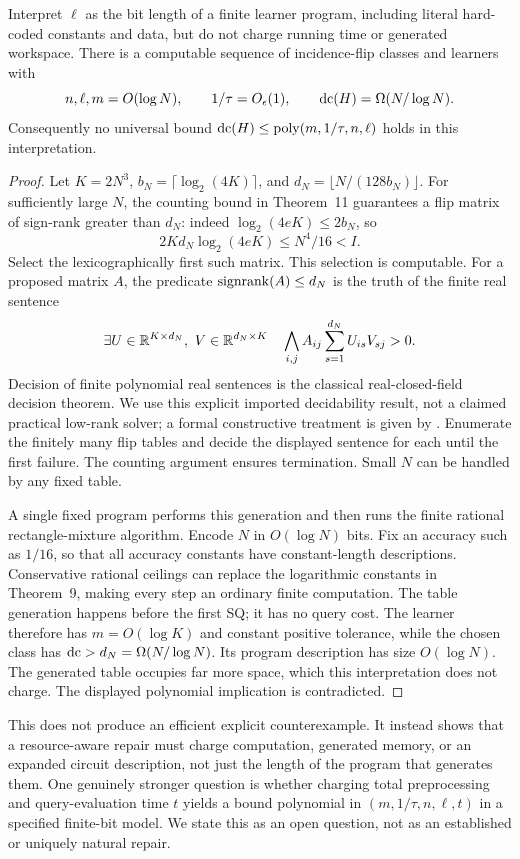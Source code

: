 \begin{theorem}\label{thm:description}
Interpret $\ell$ as the bit length of a finite learner program, including literal hard-coded constants and data, but do not charge running time or generated workspace. There is a computable sequence of incidence-flip classes and learners with
\[
 n,\ell,m=O(\log N),\qquad 1/\tau=O_\epsilon(1),\qquad
 \operatorname{dc}(H)=\Omega(N/\log N).
\]
Consequently no universal bound $\operatorname{dc}(H)\le\operatorname{poly}(m,1/\tau,n,\ell)$ holds in this interpretation.
\end{theorem}
\begin{proof}
Let $K=2N^3$, $b_N=\lceil\log_2(4K)\rceil$, and $d_N=\lfloor N/(128b_N)\rfloor$. For sufficiently large $N$, the counting bound in Theorem~11 guarantees a flip matrix of sign-rank greater than $d_N$: indeed $\log_2(4eK)\le2b_N$, so
\[
 2Kd_N\log_2(4eK)\le N^4/16<I.
\]
Select the lexicographically first such matrix. This selection is computable. For a proposed matrix $A$, the predicate $\operatorname{signrank}(A)\le d_N$ is the truth of the finite real sentence
\[
 \exists U\in\mathbb R^{K\times d_N},\ V\in\mathbb R^{d_N\times K}\quad
 \bigwedge_{i,j} A_{ij}\sum_{s=1}^{d_N}U_{is}V_{sj}>0.
\]
Decision of finite polynomial real sentences is the classical real-closed-field decision theorem. We use this explicit imported decidability result, not a claimed practical low-rank solver; a formal constructive treatment is given by \citet{MC12}. Enumerate the finitely many flip tables and decide the displayed sentence for each until the first failure. The counting argument ensures termination. Small $N$ can be handled by any fixed table.

A single fixed program performs this generation and then runs the finite rational rectangle-mixture algorithm. Encode $N$ in $O(\log N)$ bits. Fix an accuracy such as $1/16$, so that all accuracy constants have constant-length descriptions. Conservative rational ceilings can replace the logarithmic constants in Theorem~9, making every step an ordinary finite computation. The table generation happens before the first SQ; it has no query cost. The learner therefore has $m=O(\log K)$ and constant positive tolerance, while the chosen class has $\operatorname{dc}>d_N=\Omega(N/\log N)$. Its program description has size $O(\log N)$. The generated table occupies far more space, which this interpretation does not charge. The displayed polynomial implication is contradicted.
\end{proof}

This does not produce an efficient explicit counterexample. It instead shows that a resource-aware repair must charge computation, generated memory, or an expanded circuit description, not just the length of the program that generates them. One genuinely stronger question is whether charging total preprocessing and query-evaluation time $t$ yields a bound polynomial in $(m,1/\tau,n,\ell,t)$ in a specified finite-bit model. We state this as an open question, not as an established or uniquely natural repair.


